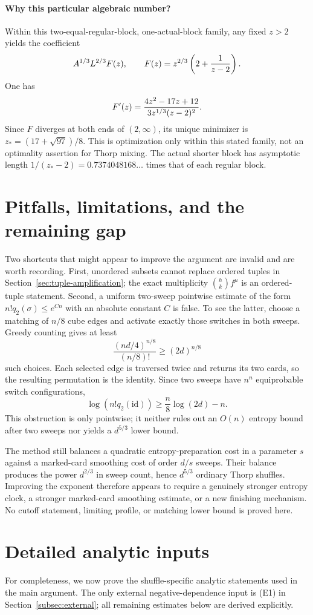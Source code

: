 \documentclass[11pt]{article}
\numberwithin{equation}{section}
\theoremstyle{definition}\newtheorem{definition}[theorem]{Definition}
\theoremstyle{remark}\newtheorem{remark}[theorem]{Remark}
\newcommand{\id}{\mathrm{id}}
\begin{document}
\paragraph{Why this particular algebraic number?}
Within this two-equal-regular-block, one-actual-block family, any fixed
$z>2$ yields the coefficient
\[
 A^{1/3}L^{2/3}F(z),\qquad F(z)=z^{2/3}\left(2+{1\over z-2}\right).
\]
One has
\[
 F'(z)={4z^2-17z+12\over3z^{1/3}(z-2)^2}.
\]
Since $F$ diverges at both ends of $(2,\infty)$, its unique minimizer is
$z_*=(17+\sqrt{97})/8$. This is optimization only within this stated
family, not an optimality assertion for Thorp mixing. The actual shorter
block has asymptotic length $1/(z_*-2)=0.7374048168\ldots$ times that of
each regular block.

\section{Pitfalls, limitations, and the remaining gap}\label{sec:limitations}
Two shortcuts that might appear to improve the argument are invalid and are
worth recording.  First, unordered subsets cannot replace ordered tuples in
Section~\ref{sec:tuple-amplification}; the exact multiplicity
$\binom hk f^\mu$ is an ordered-tuple statement.  Second, a uniform two-sweep
pointwise estimate of the form $n!q_2(\sigma)\le e^{Cn}$ with an absolute
constant $C$ is false.  To see the latter, choose a matching of $n/8$ cube
edges and activate exactly those switches in both sweeps.  Greedy counting
gives at least
\[
 \frac{(nd/4)^{n/8}}{(n/8)!}\ge (2d)^{n/8}
\]
such choices.  Each selected edge is traversed twice and returns its two cards,
so the resulting permutation is the identity.  Since two sweeps have $n^n$
equiprobable switch configurations,
\[
 \log(n!q_2(\id))\ge \frac n8\log(2d)-n.
\]
This obstruction is only pointwise; it neither rules out an $O(n)$ entropy
bound after two sweeps nor yields a $d^{5/3}$ lower bound.

The method still balances a quadratic entropy-preparation cost in a parameter
$s$ against a marked-card smoothing cost of order $d/s$ sweeps.  Their balance
produces the power $d^{2/3}$ in sweep count, hence $d^{5/3}$ ordinary Thorp
shuffles.  Improving the exponent therefore appears to require a genuinely
stronger entropy clock, a stronger marked-card smoothing estimate, or a new
finishing mechanism.  No cutoff statement, limiting profile, or matching lower
bound is proved here.

\appendix
\section*{Detailed analytic inputs}
For completeness, we now prove the shuffle-specific analytic statements used
in the main argument.  The only external negative-dependence input is (E1) in
Section~\ref{subsec:external}; all remaining estimates below are derived
explicitly.
\end{document}
